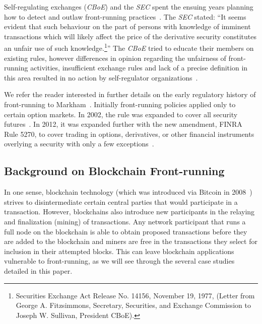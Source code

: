 
Self-regulating exchanges (\eg \textit{CBoE}) and the \textit{SEC} spent the ensuing years planning how to detect and outlaw front-running practices~\cite{markham1988front}. The \textit{SEC} stated: ``It seems evident that such behaviour on the part of persons with knowledge of imminent transactions which will likely affect the price of the derivative security constitutes an unfair use of such knowledge.\footnote{Securities Exchange Act Release No. 14156, November 19, 1977, (Letter from George A. Fitzsimmons, Secretary, Securities, and Exchange Commission to Joseph W. Sullivan, President  CBoE).}'' The \textit{CBoE} tried to educate their members on existing rules, however differences in opinion regarding the unfairness of front-running activities, insufficient exchange rules and lack of a precise definition in this area resulted in no action by self-regulator organizations~\cite{sec1978optionsmarket}. 

We refer the reader interested in further details on the early regulatory history of front-running to Markham~\cite{markham1988front}. Initially front-running policies applied only to certain option markets. In 2002, the rule was expanded to cover all security futures~\cite{finra_2002}. In 2012, it was expanded further with the new amendment, FINRA Rule 5270, to cover trading in options, derivatives, or other financial instruments overlying a security with only a few exceptions~\cite{sec2012frontrunning, finra_2012}.


\subsection{Background on Blockchain Front-running} \label{sec:Front Running on the Blockchains}


In one sense, blockchain technology (which was introduced via Bitcoin in 2008~\cite{nakamoto2008bitcoin}) strives to disintermediate certain central parties that would participate in a transaction. However, blockchains also introduce new participants in the relaying and finalization (\ie mining) of transactions. Any network participant that runs a full node on the blockchain is able to obtain proposed transactions before they are added to the blockchain and miners are free in the transactions they select for inclusion in their attempted blocks. This can leave blockchain applications vulnerable to front-running, as we will see through the several case studies detailed in this paper.


